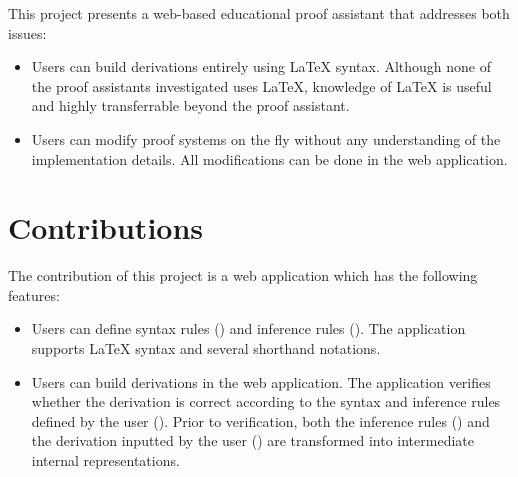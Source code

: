 This project presents a web-based educational proof assistant that addresses both issues:
\begin{itemize}
    \item Users can build derivations entirely using \LaTeX{} syntax. Although none of the proof assistants investigated uses \LaTeX{}, knowledge of \LaTeX{} is useful and highly transferrable beyond the proof assistant.
    \item Users can modify proof systems on the fly without any understanding of the implementation details. All modifications can be done in the web application.
\end{itemize}

\section{Contributions}
The contribution of this project is a web application which has the following features:
\begin{itemize}
    \item Users can define syntax rules () and inference rules (). The application supports \LaTeX{} syntax and several shorthand notations.
    \item Users can build derivations in the web application. The application verifies whether the derivation is correct according to the syntax and inference rules defined by the user (). Prior to verification, both the inference rules () and the derivation inputted by the user () are transformed into intermediate internal representations.
\end{itemize}